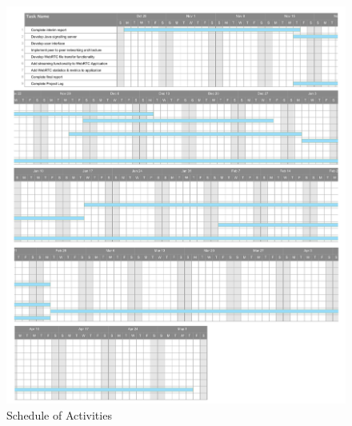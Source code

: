 \documentclass[]{report}
\begin{document}
			\newpage
			\begin{figure}[h!]
				\caption{Schedule of Activities}
				\includegraphics[scale=0.5]{ganttchart.png}
			\end{figure}
			\newpage	
			
\end{document}
